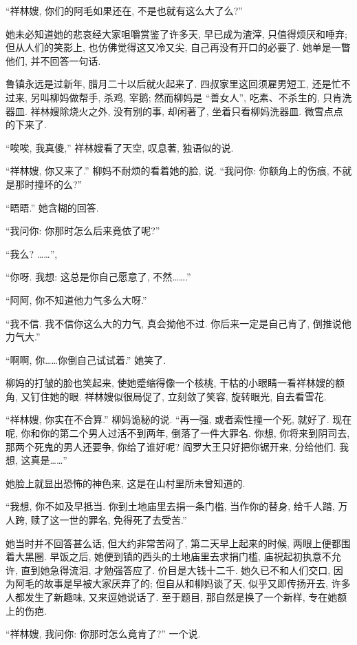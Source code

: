 ``祥林嫂, 你们的阿毛如果还在, 不是也就有这么大了么?''

她未必知道她的悲哀经大家咀嚼赏鉴了许多天,
早已成为渣滓, 只值得烦厌和唾弃;
但从人们的笑影上, 也仿佛觉得这又冷又尖, 自己再没有开口的必要了.
她单是一瞥他们, 并不回答一句话.

鲁镇永远是过新年, 腊月二十以后就火起来了.
四叔家里这回须雇男短工, 还是忙不过来,
另叫柳妈做帮手, 杀鸡, 宰鹅;
然而柳妈是 ``善女人'', 吃素、不杀生的, 只肯洗器皿.
祥林嫂除烧火之外, 没有别的事, 却闲著了, 坐着只看柳妈洗器皿.
微雪点点的下来了.

``唉唉, 我真傻,''
祥林嫂看了天空, 叹息著, 独语似的说.

``祥林嫂, 你又来了.''
柳妈不耐烦的看着她的脸, 说.
``我问你:
你额角上的伤痕, 不就是那时撞坏的么?''

``晤晤.''
她含糊的回答.

``我问你:
你那时怎么后来竟依了呢?''

``我么? ……'',

``你呀.
我想:
这总是你自己愿意了, 不然…….''

``阿阿, 你不知道他力气多么大呀.''

``我不信.
我不信你这么大的力气, 真会拗他不过.
你后来一定是自己肯了, 倒推说他力气大.''

``啊啊, 你……你倒自己试试着.'' 她笑了.

柳妈的打皱的脸也笑起来,
使她蹙缩得像一个核桃, 干枯的小眼睛一看祥林嫂的额角, 又钉住她的眼.
祥林嫂似很局促了, 立刻敛了笑容, 旋转眼光, 自去看雪花.

``祥林嫂, 你实在不合算.''
柳妈诡秘的说.
``再一强, 或者索性撞一个死, 就好了.
现在呢, 你和你的第二个男人过活不到两年, 倒落了一件大罪名.
你想, 你将来到阴司去, 那两个死鬼的男人还要争, 你给了谁好呢?
阎罗大王只好把你锯开来, 分给他们.
我想, 这真是……''

她脸上就显出恐怖的神色来, 这是在山村里所未曾知道的.

``我想, 你不如及早抵当.
你到土地庙里去捐一条门槛, 当作你的替身,
给千人踏, 万人跨, 赎了这一世的罪名, 免得死了去受苦.''

她当时并不回答甚么话, 但大约非常苦闷了,
第二天早上起来的时候, 两眼上便都围着大黑圈.
早饭之后, 她便到镇的西头的土地庙里去求捐门槛,
庙祝起初执意不允许, 直到她急得流泪, 才勉强答应了.
价目是大钱十二千.
她久已不和人们交口, 因为阿毛的故事是早被大家厌弃了的;
但自从和柳妈谈了天, 似乎又即传扬开去,
许多人都发生了新趣味, 又来逗她说话了.
至于题目, 那自然是换了一个新样, 专在她额上的伤疤.

``祥林嫂, 我问你:
你那时怎么竟肯了?'' 一个说.

